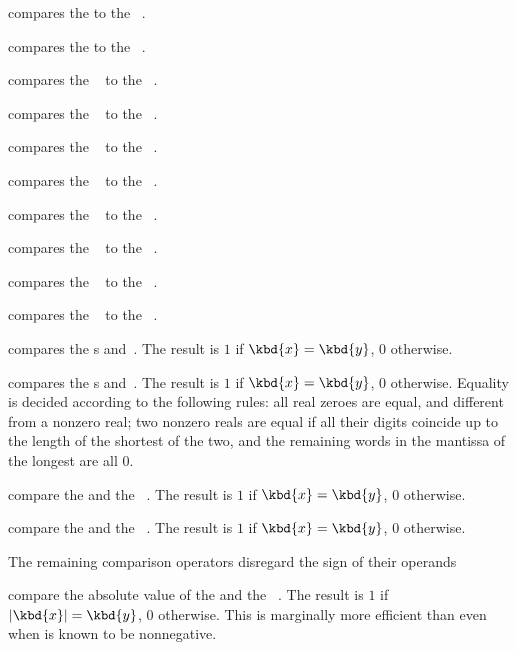  compares the   to the
~.

 compares the   to the
~.

 compares the ~ to the
~.

 compares the ~ to the
~.

 compares the ~ to the
~.

 compares the ~ to the
~.

 compares the ~ to the
~.

 compares the ~ to the
~.

 compares the ~ to the
~.

 compares the ~ to the
~.

 compares the s  and~.
The result is $1$ if $\kbd{x} = \kbd{y}$, $0$ otherwise.

 compares the s  and~.
The result is $1$ if $\kbd{x} = \kbd{y}$, $0$ otherwise. Equality is decided
according to the following rules: all real zeroes are equal, and
different from a nonzero real; two nonzero reals are equal if all their
digits coincide up to the length of the shortest of the two, and the
remaining words in the mantissa of the longest are all $0$.

 compare the   and
the ~. The result is $1$ if $\kbd{x} = \kbd{y}$, $0$ otherwise.


 compare the   and
the ~. The result is $1$ if $\kbd{x} = \kbd{y}$, $0$
otherwise.


The remaining comparison operators disregard the sign of their operands

 compare the absolute value of the
  and the ~. The result is $1$ if
$|\kbd{x}| = \kbd{y}$, $0$ otherwise. This is marginally more efficient
than  even when  is known to be nonnegative.

